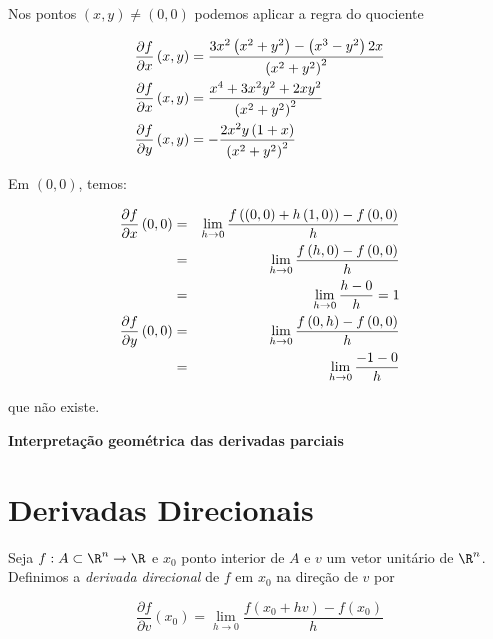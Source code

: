 \documentclass[11pt, oneside, a4paper]{gsm-l}
\begin{document}
\begin{sol}
    Nos pontos $\left( {x,y} \right) \ne \left( {0,0} \right)$ podemos aplicar a regra do quociente

\[
\begin{gathered}
\frac{{\partial f}}
{{\partial x}}\left( {x,y} \right) = \frac{{3x^2 \left( {x^2  + y^2 } \right) - \left( {x^3  - y^2 } \right)2x}}
{{\left( {x^2  + y^2 } \right)^2 }} \hfill \\
\frac{{\partial f}}
{{\partial x}}\left( {x,y} \right) = \frac{{x^4  + 3x^2 y^2  + 2xy^2 }}
{{\left( {x^2  + y^2 } \right)^2 }} \hfill \\
\frac{{\partial f}}
{{\partial y}}\left( {x,y} \right) =  - \frac{{2x^2 y\left( {1 + x} \right)}}
{{\left( {x^2  + y^2 } \right)^2 }} \hfill \\
\end{gathered}
\]

Em $(0,0)$, temos:

\begin{eqnarray*}
  \frac{{\partial f}}{{\partial x}}\left( {0,0} \right) &=& \mathop {\lim }\limits_{h \to 0} \frac{{f\left( {\left( {0,0} \right) + h\left( {1,0} \right)} \right) - f\left( {0,0} \right)}}{h} \hfill \\
   &=& \mathop {\lim }\limits_{h \to 0} \frac{{f\left( {h,0} \right) - f\left( {0,0} \right)}}{h} \hfill \\
&=& \mathop {\lim }\limits_{h \to 0} \frac{{h - 0}}
{h} = 1 \hfill \\
  \frac{{\partial f}}{{\partial y}}\left( {0,0} \right) &=& \mathop {\lim }\limits_{h \to 0} \frac{{f\left( {0,h} \right) - f\left( {0,0} \right)}}{h} \hfill \\
&=& \mathop {\lim }\limits_{h \to 0} \frac{{ - 1 - 0}}{h} \hfill \\
\end{eqnarray*}

que não existe.
\end{sol}

\textbf{Interpretação geométrica das derivadas parciais}


\section{Derivadas Direcionais} \label{sec13}

\begin{defi}
    Seja $f:A \subset \R^n \to \R$ e $x_0$ ponto interior de $A$ e $v$ um vetor unitário de $\R^n$. Definimos a \textit{derivada direcional} de $f$ em $x_0$ na direção de $v$ por

\[\boxed{
    \frac{{\partial f}}{{\partial v }}\left( {x_0 } \right) = \mathop {\lim }\limits_{h \to 0} \frac{{f\left( {x_0  + hv } \right) - f\left( {x_0 } \right)}}{h}}
\]

\end{defi}
\end{document}
